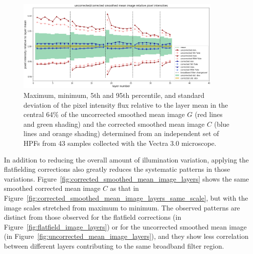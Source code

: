 \documentclass[letterpaper,11pt]{article}
\newcommand{\reffig}[1]{Figure~\ref{#1}}
\begin{document}
\begin{figure}[!ht]
\centering
\includegraphics[width=0.90\textwidth]{images/results/illumination_variation_reduction}
\caption{\footnotesize Maximum, minimum, 5th and 95th percentile, and standard deviation of the pixel intensity flux relative to the layer mean in the central 64\% of the uncorrected smoothed mean image $G$ (red lines and green shading) and the corrected smoothed mean image $C$ (blue lines and orange shading) determined from an independent set of HPFs from 43 samples collected with the Vectra 3.0 microscope.}
\label{fig:illumination_variation_reduction}
\end{figure} 

In addition to reducing the overall amount of illumination variation, applying the flatfielding corrections also greatly reduces the systematic patterns in those variations. \reffig{fig:corrected_smoothed_mean_image_layers} shows the same smoothed corrected mean image $C$ as that in \reffig{fig:corrected_smoothed_mean_image_layers_same_scale}, but with the image scales stretched from maximum to minimum. The observed patterns are distinct from those observed for the flatfield corrections (in \reffig{fig:flatfield_image_layers}) or for the uncorrected smoothed mean image (in \reffig{fig:uncorrected_mean_image_layers}), and they show less correlation between different layers contributing to the same broadband filter region.
\end{document}
